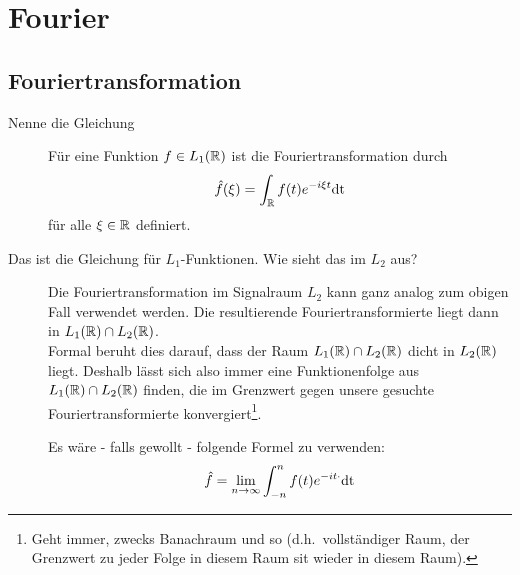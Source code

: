\section{Fourier}
\subsection{Fouriertransformation}
\begin{description}
	\item[Nenne die Gleichung]
      Für eine Funktion $f \in L_1(\mathbb{R})$ ist die Fouriertransformation durch
      $$ \hat f(\xi) = \int_{\mathbb{R}} f(t) e^{-i\xi t}\text{dt} $$
      für alle $\xi \in \mathbb{R}$ definiert.
    \item[Das ist die Gleichung für $L_1$-Funktionen. Wie sieht das im $L_2$ aus?]
      Die Fouriertransformation im Signalraum $L_2$ kann ganz analog zum obigen Fall verwendet werden.
      Die resultierende Fouriertransformierte liegt dann in $L_1(\mathbb{R}) \cap L_2(\mathbb{R})$.\\
      Formal beruht dies darauf, dass der Raum $L_1(\mathbb{R})\cap L_2(\mathbb{R})$ dicht in $L_2(\mathbb{R})$ liegt. Deshalb
      lässt sich also immer eine Funktionenfolge aus $L_1(\mathbb{R})\cap L_2(\mathbb{R})$ finden, die im Grenzwert
      gegen unsere gesuchte Fouriertransformierte konvergiert\footnote{Geht immer, zwecks 
      Banachraum und so (d.h.\ vollständiger Raum, der Grenzwert zu jeder Folge in diesem Raum sit 
      wieder in diesem Raum).}.

      Es wäre - falls gewollt - folgende Formel zu verwenden:
      $$ \hat f = \lim\limits_{n\to\infty} \int_{-n}^n f(t) e^{-it \cdot}\text{dt} $$


\end{description}
